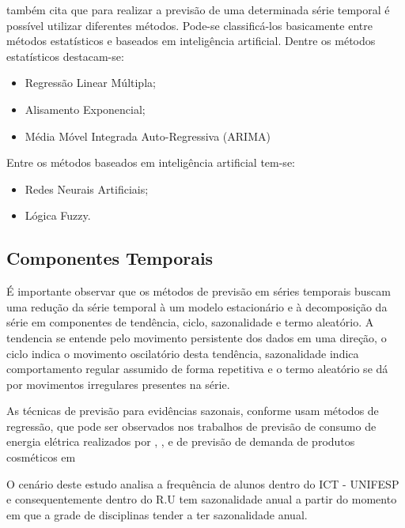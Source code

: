 \documentclass[	12pt, Times, openright, twoside, a4paper, english, brazil]{abntex2}
\begin{document}
          \cite{Almeida2013} também cita que para realizar a previsão de uma determinada série temporal é possível utilizar diferentes métodos. Pode-se classificá-los basicamente entre métodos estatísticos e baseados em inteligência artificial.
          Dentre os métodos estatísticos destacam-se:
          \begin{itemize}
          \item Regressão Linear Múltipla;
          \item Alisamento Exponencial;
          \item Média Móvel Integrada Auto-Regressiva (ARIMA)
          \end{itemize}
          Entre os métodos baseados em inteligência artificial tem-se:
          \begin{itemize}
          \item Redes Neurais Artificiais;
          \item Lógica Fuzzy.
          \end{itemize}

        \subsection{Componentes Temporais}

          É importante observar que os métodos de previsão em séries temporais buscam uma redução da série temporal à um modelo estacionário e à decomposição da série em componentes de tendência, ciclo, sazonalidade e termo aleatório. A tendencia se entende pelo movimento persistente dos dados em uma direção, o ciclo indica o movimento oscilatório desta tendência, sazonalidade indica comportamento regular assumido de forma repetitiva e o termo aleatório se dá por movimentos irregulares presentes na série.
           
          As técnicas de previsão para evidências sazonais, conforme  usam métodos de regressão, que pode ser observados nos trabalhos de previsão de consumo de energia elétrica realizados por \cite{Almeida2013}, \cite{Ruas2012}, \cite{Silva2010} e de previsão de demanda de produtos cosméticos em \cite{Junior2007}

          O cenário deste estudo analisa a frequência de alunos dentro do ICT - UNIFESP e consequentemente dentro do R.U tem sazonalidade anual a partir do momento em que a grade de disciplinas tender a ter sazonalidade anual. 
\end{document}
